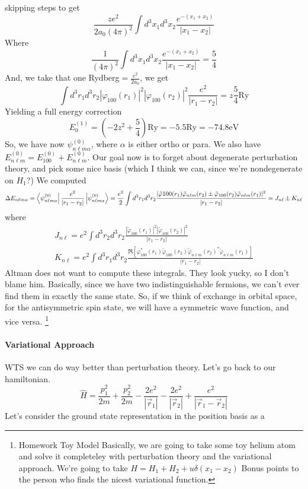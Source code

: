 \documentclass{article}
\theoremstyle{definition}
\begin{document}
skipping steps to get \begin{equation} \frac{ze^2}{2a_0(4\pi)^2}\int d^3x_1d^3x_2\frac{e^{-(x_1+x_2)}}{|x_1-x_2|} \end{equation} Where \begin{equation} \frac{1}{(4\pi)^2}\int d^3x_1d^3x_2\frac{e^{-(x_1+x_2)}}{|x_1-x_2|}=\frac{5}{4} \end{equation} And, we take that one Rydberg$=\frac{e^2}{2a_0}$, we get \begin{equation} \int d^3r_1d^3r_2|\varphi_{100}(r_1)|^2|\varphi_{100}(r_2)|^2\frac{e^2}{|r_1-r_2|}=z\frac{5}{4}\mathrm{Ry} \end{equation} Yielding a full energy correction \begin{equation} E_0^{(1)}=\left(-2z^2+\frac{5}{4}\right)\mathrm{Ry}=-5.5\mathrm{Ry}=-74.8\mathrm{eV} \end{equation} So, we have now $\psi^{(0)}_{n\ell m\alpha}$, where $\alpha$ is either ortho or para. We also have $E_{n\ell m}^{(0)}=E_{100}^{(0)}+E_{n\ell m}^{(0)}$. Our goal now is to forget about degenerate perturbation theory, and pick some nice basis (which I think we can, since we're nondegenerate on $H_1$?) We computed \begin{equation} \Delta E_{n\ell m\alpha}=\bra{\psi^{(0)}_{n\ell m\alpha}}\frac{e^2}{|r_1-r_2|}\ket{\psi^{(0)}_{n\ell m\alpha}} =\frac{e^2}{2}\int d^3r_1d^3r_2 \frac{ |\tilde\varphi{100}(r_1)\tilde\varphi_{n\ell m}(r_2)\pm\tilde\varphi_{100}(r_2)\tilde\varphi_{n\ell m}(r_1)|^2 }{|r_1-r_2|} =J_{n\ell}\pm K_{n\ell} \end{equation} where \begin{align} J_{n\ell}=e^2\int d^3r_2d^3r_2\frac{|\tilde\varphi_{100}(r_1)|^2|\tilde\varphi_{100}(r_2)|^2}{|r_1-r_2|} \\ K_{n\ell}=e^2\int d^3r_1d^3r_2\frac{\Re[\varphi^*_{100}(r_1)\tilde\varphi_{100}(r_2)\tilde\varphi_{n\ell m}(r_2)^*\tilde\varphi_{n\ell m}(r_1)]}{|r_1-r_2|} \end{align} Altman does not want to compute these integrals. They look yucky, so I don't blame him. Basically, since we have two indistinguishable fermions, we can't ever find them in exactly the same state. So, if we think of exchange in orbital space, for the antisymmetric spin state, we will have a symmetric wave function, and vice versa. \footnote{Homework Toy Model Basically, we are going to take some toy helium atom and solve it completeley with perturbation theory and the variational approach. We're going to take $H=H_1+H_2+u\delta(x_1-x_2)$ Bonus points to the person who finds the nicest variational function. } \paragraph{Variational Approach} WTS we can do way better than perturbation theory. Let's go back to our hamiltonian. \begin{equation} \hat H=\frac{p_1^2}{2m}+\frac{p_2^2}{2m}-\frac{2e^2}{|\vec{r}_1|}-\frac{2e^2}{|\vec{r}_2|}+\frac{e^2}{|\vec{r}_1-\vec{r}_2|} \end{equation} Let's consider the ground state representation in the position basis as a 
\end{document}
